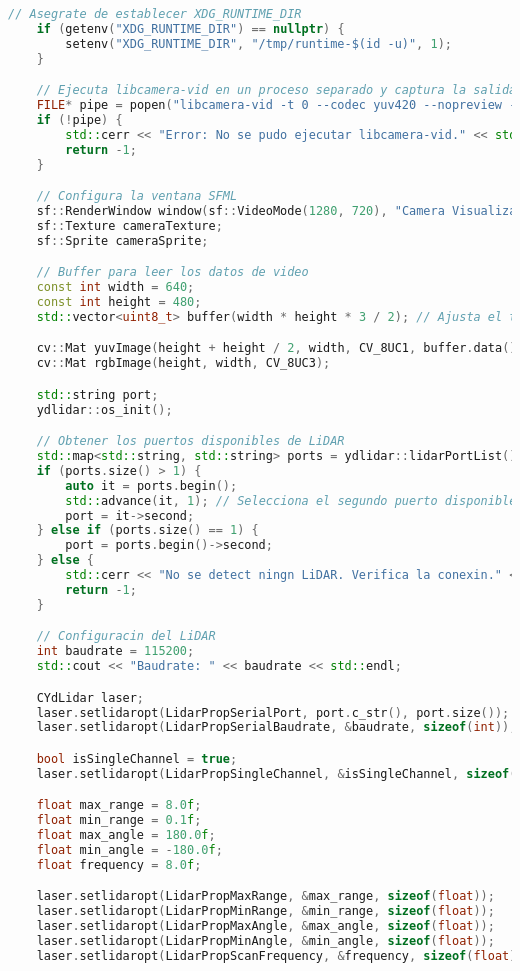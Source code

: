 \begin{lstlisting}[language={C++}, caption={Primer ajuste de c\'odigo}, label={Script}]
    // Asegrate de establecer XDG_RUNTIME_DIR
    if (getenv("XDG_RUNTIME_DIR") == nullptr) {
        setenv("XDG_RUNTIME_DIR", "/tmp/runtime-$(id -u)", 1);
    }

    // Ejecuta libcamera-vid en un proceso separado y captura la salida en YUV, sin previsualizacn
    FILE* pipe = popen("libcamera-vid -t 0 --codec yuv420 --nopreview -o -", "r");
    if (!pipe) {
        std::cerr << "Error: No se pudo ejecutar libcamera-vid." << std::endl;
        return -1;
    }

    // Configura la ventana SFML
    sf::RenderWindow window(sf::VideoMode(1280, 720), "Camera Visualization with LiDAR");
    sf::Texture cameraTexture;
    sf::Sprite cameraSprite;

    // Buffer para leer los datos de video
    const int width = 640;
    const int height = 480;
    std::vector<uint8_t> buffer(width * height * 3 / 2); // Ajusta el tamao del buffer para YUV420

    cv::Mat yuvImage(height + height / 2, width, CV_8UC1, buffer.data());
    cv::Mat rgbImage(height, width, CV_8UC3);

    std::string port;
    ydlidar::os_init();

    // Obtener los puertos disponibles de LiDAR
    std::map<std::string, std::string> ports = ydlidar::lidarPortList();
    if (ports.size() > 1) {
        auto it = ports.begin();
        std::advance(it, 1); // Selecciona el segundo puerto disponible
        port = it->second;
    } else if (ports.size() == 1) {
        port = ports.begin()->second;
    } else {
        std::cerr << "No se detect ningn LiDAR. Verifica la conexin." << std::endl;
        return -1;
    }

    // Configuracin del LiDAR
    int baudrate = 115200;
    std::cout << "Baudrate: " << baudrate << std::endl;

    CYdLidar laser;
    laser.setlidaropt(LidarPropSerialPort, port.c_str(), port.size());
    laser.setlidaropt(LidarPropSerialBaudrate, &baudrate, sizeof(int));

    bool isSingleChannel = true;
    laser.setlidaropt(LidarPropSingleChannel, &isSingleChannel, sizeof(bool));

    float max_range = 8.0f;
    float min_range = 0.1f;
    float max_angle = 180.0f;
    float min_angle = -180.0f;
    float frequency = 8.0f;

    laser.setlidaropt(LidarPropMaxRange, &max_range, sizeof(float));
    laser.setlidaropt(LidarPropMinRange, &min_range, sizeof(float));
    laser.setlidaropt(LidarPropMaxAngle, &max_angle, sizeof(float));
    laser.setlidaropt(LidarPropMinAngle, &min_angle, sizeof(float));
    laser.setlidaropt(LidarPropScanFrequency, &frequency, sizeof(float));


\end{lstlisting}
